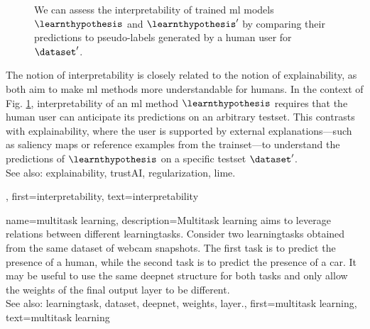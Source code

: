 {{\begin{figure}[H]
\begin{center}
 			\caption{We can assess the interpretability of trained \gls{ml} \glspl{model} 
 			$\learnthypothesis$ and $\learnthypothesis'$ by comparing their \glspl{prediction} 
			to pseudo-\glspl{label} generated by a human user for $\dataset'$. 
			\label{fig_aug_simulatability_dict}}
 			\end{center}
	 	\end{figure} 
 	 	The notion of interpretability is closely related to the notion of \gls{explainability}, 
 	 	as both aim to make \gls{ml} methods more understandable for humans. 
		In the context of Fig. \ref{fig_aug_simulatability_dict}, interpretability of an \gls{ml} 
	 	method $\learnthypothesis$ requires that the human user can anticipate its \glspl{prediction} 
	 	on an arbitrary \gls{testset}. This contrasts with \gls{explainability}, where the user is supported by 
	 	external \glspl{explanation}—such as saliency \glspl{map} or reference examples from the \gls{trainset}—to 
		understand the \glspl{prediction} of $\learnthypothesis$ on a specific \gls{testset} $\dataset'$. 
	 	\\ 
	 	See also: \gls{explainability}, \gls{trustAI}, \gls{regularization}, \gls{lime}. },
	first={interpretability},
 	text={interpretability}
}

{name={multitask learning},
	description={Multitask learning aims to leverage relations between 
	 	different \glspl{learningtask}. Consider two \glspl{learningtask} obtained from the 
	 	same \gls{dataset} of webcam snapshots. The first task is to predict the presence 
	 	of a human, while the second task is to predict the presence of a car. It may be useful 
	 	to use the same \gls{deepnet} structure for both tasks and only allow the \gls{weights} of 
	 	the final output \gls{layer} to be different.
	 			\\ 
		See also: \gls{learningtask}, \gls{dataset}, \gls{deepnet}, \gls{weights}, \gls{layer}.},
	first={multitask learning},
	text={multitask learning}
}

